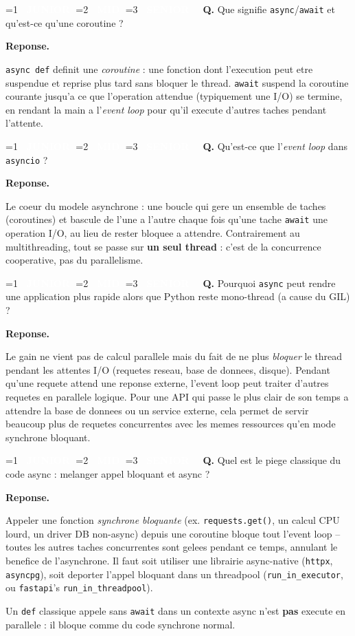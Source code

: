 \documentclass[11pt,a4paper]{article}
\newcommand{\badgeJ}{\textcolor{white}{\colorbox{junior}{\small\bfseries\ JUNIOR\ }}}
\newcommand{\badgeM}{\textcolor{white}{\colorbox{mid}{\small\bfseries\ MID\ }}}
\newcommand{\badgeS}{\textcolor{white}{\colorbox{senior}{\small\bfseries\ SENIOR\ }}}
\newcounter{qcount}
\newenvironment{qa}[2]{%
  \stepcounter{qcount}%
  \par\vspace{6pt}%
  \noindent\colorbox{qbg}{\parbox{\dimexpr\linewidth-12pt}{\vspace{2pt}%
  \ifnum#1=1 \badgeJ\fi\ifnum#1=2 \badgeM\fi\ifnum#1=3 \badgeS\fi
  \ \textbf{Q\theqcount.} #2\vspace{2pt}}}\par\vspace{4pt}%
  \noindent\textbf{\color{accent}Reponse.}\ \ignorespaces
}{%
  \par\vspace{8pt}%
}
\begin{document}
\begin{qa}{2}{Que signifie \texttt{async}/\texttt{await} et qu'est-ce qu'une coroutine ?}
\texttt{async def} definit une \emph{coroutine} : une fonction dont
l'execution peut etre suspendue et reprise plus tard sans bloquer le thread.
\texttt{await} suspend la coroutine courante jusqu'a ce que l'operation
attendue (typiquement une I/O) se termine, en rendant la main a l'\emph{event
loop} pour qu'il execute d'autres taches pendant l'attente.
\end{qa}

\begin{qa}{2}{Qu'est-ce que l'\emph{event loop} dans \texttt{asyncio} ?}
Le coeur du modele asynchrone : une boucle qui gere un ensemble de taches
(coroutines) et bascule de l'une a l'autre chaque fois qu'une tache
\texttt{await} une operation I/O, au lieu de rester bloquee a attendre.
Contrairement au multithreading, tout se passe sur \textbf{un seul thread} :
c'est de la concurrence cooperative, pas du parallelisme.
\end{qa}

\begin{qa}{2}{Pourquoi \texttt{async} peut rendre une application plus rapide alors que Python reste mono-thread (a cause du GIL) ?}
Le gain ne vient pas de calcul parallele mais du fait de ne plus \emph{bloquer}
le thread pendant les attentes I/O (requetes reseau, base de donnees, disque).
Pendant qu'une requete attend une reponse externe, l'event loop peut traiter
d'autres requetes en parallele logique. Pour une API qui passe le plus clair
de son temps a attendre la base de donnees ou un service externe, cela permet
de servir beaucoup plus de requetes concurrentes avec les memes ressources
qu'en mode synchrone bloquant.
\end{qa}

\begin{qa}{3}{Quel est le piege classique du code async : melanger appel bloquant et async ?}
Appeler une fonction \emph{synchrone bloquante} (ex. \texttt{requests.get()},
un calcul CPU lourd, un driver DB non-async) depuis une coroutine bloque tout
l'event loop -- toutes les autres taches concurrentes sont gelees pendant ce
temps, annulant le benefice de l'asynchrone. Il faut soit utiliser une
librairie async-native (\texttt{httpx}, \texttt{asyncpg}), soit deporter
l'appel bloquant dans un threadpool (\texttt{run\_in\_executor}, ou
\texttt{fastapi}'s \texttt{run\_in\_threadpool}).
\begin{piege}
Un \texttt{def} classique appele sans \texttt{await} dans un contexte async
n'est \textbf{pas} execute en parallele : il bloque comme du code synchrone
normal.
\end{piege}
\end{qa}
\end{document}
